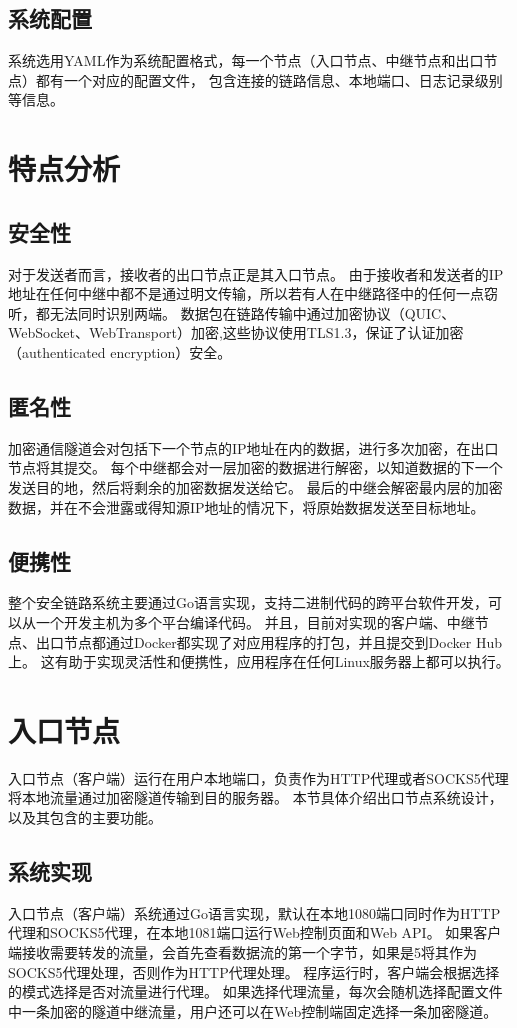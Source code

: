 \subsection{系统配置}
系统选用YAML作为系统配置格式，每一个节点（入口节点、中继节点和出口节点）都有一个对应的配置文件，
包含连接的链路信息、本地端口、日志记录级别等信息。

\section{特点分析}
\subsection{安全性}
对于发送者而言，接收者的出口节点正是其入口节点。
由于接收者和发送者的IP地址在任何中继中都不是通过明文传输，所以若有人在中继路径中的任何一点窃听，都无法同时识别两端。
数据包在链路传输中通过加密协议（QUIC、WebSocket、WebTransport）加密,这些协议使用TLS1.3，保证了认证加密（authenticated encryption）安全。

\subsection{匿名性}
加密通信隧道会对包括下一个节点的IP地址在内的数据，进行多次加密，在出口节点将其提交。
每个中继都会对一层加密的数据进行解密，以知道数据的下一个发送目的地，然后将剩余的加密数据发送给它。
最后的中继会解密最内层的加密数据，并在不会泄露或得知源IP地址的情况下，将原始数据发送至目标地址。

\subsection{便携性}
整个安全链路系统主要通过Go语言实现，支持二进制代码的跨平台软件开发，可以从一个开发主机为多个平台编译代码。
并且，目前对实现的客户端、中继节点、出口节点都通过Docker都实现了对应用程序的打包，并且提交到Docker Hub上。
这有助于实现灵活性和便携性，应用程序在任何Linux服务器上都可以执行。


\section{入口节点}
入口节点（客户端）运行在用户本地端口，负责作为HTTP代理或者SOCKS5代理将本地流量通过加密隧道传输到目的服务器。
本节具体介绍出口节点系统设计，以及其包含的主要功能。

\subsection{系统实现}
入口节点（客户端）系统通过Go语言实现，默认在本地1080端口同时作为HTTP代理和SOCKS5代理，在本地1081端口运行Web控制页面和Web API。
如果客户端接收需要转发的流量，会首先查看数据流的第一个字节，如果是5将其作为SOCKS5代理处理，否则作为HTTP代理处理。
程序运行时，客户端会根据选择的模式选择是否对流量进行代理。
如果选择代理流量，每次会随机选择配置文件中一条加密的隧道中继流量，用户还可以在Web控制端固定选择一条加密隧道。

